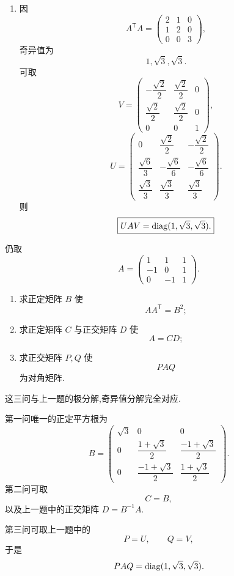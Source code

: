 \begin{solution}
\begin{enumerate}
    \item 因
    \[
    A^{\mathsf T}A
    =
    \begin{pmatrix}
    2&1&0\\
    1&2&0\\
    0&0&3
    \end{pmatrix},
    \]
    奇异值为
    \[
    1,\sqrt3,\sqrt3.
    \]
    可取
    \[
    V=
    \begin{pmatrix}
    -\dfrac{\sqrt2}{2}&\dfrac{\sqrt2}{2}&0\\[4pt]
    \dfrac{\sqrt2}{2}&\dfrac{\sqrt2}{2}&0\\[4pt]
    0&0&1
    \end{pmatrix},
    \]
    \[
    U=
    \begin{pmatrix}
    0&\dfrac{\sqrt2}{2}&-\dfrac{\sqrt2}{2}\\[4pt]
    \dfrac{\sqrt6}{3}&-\dfrac{\sqrt6}{6}&-\dfrac{\sqrt6}{6}\\[4pt]
    \dfrac{\sqrt3}{3}&\dfrac{\sqrt3}{3}&\dfrac{\sqrt3}{3}
    \end{pmatrix}.
    \]
    则
    \[
    \boxed{
    UAV=\operatorname{diag}(1,\sqrt3,\sqrt3).
    }
    \]
\end{enumerate}
\end{solution}


\begin{example}
仍取
\[
A=
\begin{pmatrix}
1&1&1\\
-1&0&1\\
0&-1&1
\end{pmatrix}.
\]
\begin{enumerate}
    \item 求正定矩阵 $B$ 使
    \[
    AA^{\mathsf T}=B^2;
    \]
    \item 求正定矩阵 $C$ 与正交矩阵 $D$ 使
    \[
    A=CD;
    \]
    \item 求正交矩阵 $P,Q$ 使
    \[
    PAQ
    \]
    为对角矩阵.
\end{enumerate}
\end{example}
\exampleblank

\begin{solution}
这三问与上一题的极分解,奇异值分解完全对应.

第一问唯一的正定平方根为
\[
\boxed{
B=
\begin{pmatrix}
\sqrt3&0&0\\[2pt]
0&\dfrac{1+\sqrt3}{2}&\dfrac{-1+\sqrt3}{2}\\[5pt]
0&\dfrac{-1+\sqrt3}{2}&\dfrac{1+\sqrt3}{2}
\end{pmatrix}.
}
\]
第二问可取
\[
\boxed{C=B},
\]
以及上一题中的正交矩阵 $D=B^{-1}A$.

第三问可取上一题中的
\[
\boxed{P=U,\qquad Q=V},
\]
于是
\[
PAQ=\operatorname{diag}(1,\sqrt3,\sqrt3).
\]
\end{solution}



